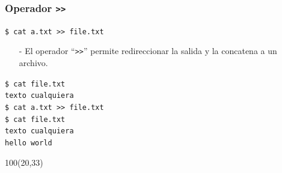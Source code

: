 \documentclass{beamer}
\begin{document}
\begin{frame}[fragile,t]
    \frametitle{Operador \texttt{>>}}
    \begin{block}{\vspace*{-3ex}}
    \texttt{\$}\verb: cat a.txt >> file.txt:
    \vspace*{0.5ex}
    \end{block}
    \begin{itemize}
    \item[-] El operador ``\verb|>>|'' permite redireccionar la salida y la concatena a un archivo.
    \end{itemize}
    \vspace{1.8cm}
    \pause
    \begin{block}{\vspace*{-3ex}}
    \texttt{\$}\verb: cat file.txt:\\
    \verb:texto cualquiera:\\
    \vspace{0.2cm}
    \texttt{\$}\verb: cat a.txt >> file.txt:\\
    \texttt{\$}\verb: cat file.txt:\\
    \verb:texto cualquiera:\\
    \verb:hello world:
    \vspace*{0.5ex}
    \end{block}
    \begin{textblock}{100}(20,33)
    \begin{center}
    \end{center}
    \end{textblock}
\end{frame}
\end{document}
